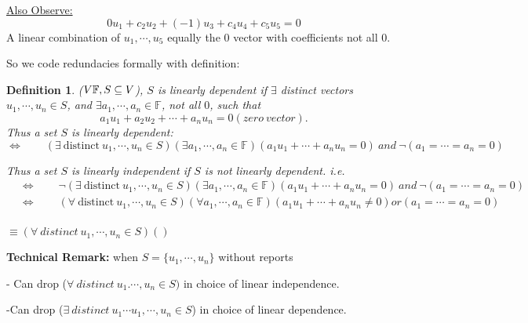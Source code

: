 \documentclass[12pt]{article}
\newtheorem{definition}{Definition}[subsection]
\newcommand{\mF}{{\mathbb{F}}}
\begin{document}
	\underline{Also Observe: }
	\[
		0u_1 + c_2u_2 + (-1)u_3 + c_4u_4 + c_5u_5 = 0
	\]
	A linear combination of $u_1,\cdots,u_5$ equally the 0 vector with 
	coefficients not all $0$. 

	So we code redundacies formally with definition: 

	\begin{definition}
		($V \/ \mF, S\subseteq V$), $S$ is linearly dependent if $\exists$
		distinct vectors $u_1, \cdots, u_n \in S$, and $\exists a_1, \cdots, a_n
		\in \mF$, not all $0$, such that 
		\[
			a_1u_1+a_2u_2+\cdots+a_nu_n = 0 (zero \ vector). 
		\]
		Thus a set $S$ is linearly dependent: 
		\[
			\Leftrightarrow\qquad 
			(\exists \ \text{distinct} \ u_1,\cdots, u_n \in S)
			(\exists a_1, \cdots, a_n \in \mF)
			(a_1u_1 + \cdots + a_nu_n = 0) \ and \
			\neg(a_1 = \cdots = a_n = 0)
		\]

		Thus a set $S$ is linearly independent if $S$ is not linearly dependent.
		i.e. 
		\begin{align*}
			&\Leftrightarrow \qquad 
			\neg (\exists \ \text{distinct} \ u_1,\cdots, u_n \in S)
			(\exists a_1, \cdots, a_n \in \mF)
			(a_1u_1 + \cdots + a_nu_n = 0) \ and \
			\neg(a_1 = \cdots = a_n = 0)\\
			&\Leftrightarrow \qquad 
			(\forall \ \text{distinct} \ u_1,\cdots, u_n \in S)
			(\forall a_1, \cdots, a_n \in \mF)
			(a_1u_1 + \cdots + a_nu_n \neq 0) or
			(a_1 = \cdots = a_n = 0)\\
		\end{align*}
		
	$\equiv (\forall \ distinct \ u_1, \cdots, u_n \in S)()$\\
	\end{definition}

	\textbf{Technical Remark: }
	when $S = \{u_1, \cdots, u_n\}$ without reports

	- Can drop ($\forall \ distinct \ u_1. \cdots, u_n \in S)$ in choice of 
	linear independence. 

	-Can drop ($\exists \ distinct \ u_1\cdots u_1, \cdots, u_n \in S$) in 
	choice of linear dependence. \\
\end{document}
